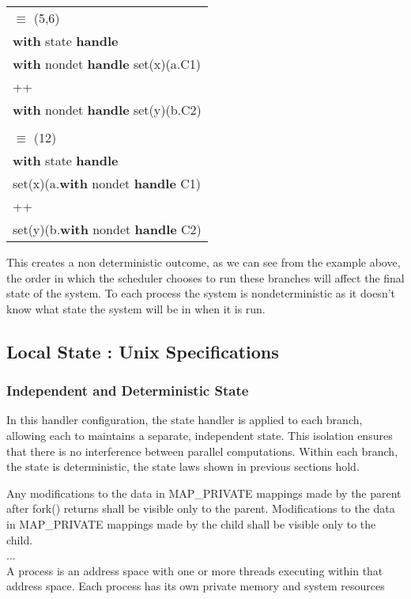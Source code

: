\documentclass[logo,bsc,singlespacing,parskip]{infthesis}
\begin{document}
\begin{longtable}{@{}l@{}}
\quad$\equiv$ (5,6) \\
\textbf{with } state \textbf{ handle} \\
\quad \textbf{with } nondet \textbf{ handle } set(x)(a.C1) \\
\quad ++ \\
\quad \textbf{with } nondet \textbf{ handle } set(y)(b.C2) \\
\\
\quad$\equiv$ (12) \\
\textbf{with } state \textbf{ handle} \\
\quad set(x)(a.\textbf{with } nondet \textbf{ handle } C1) \\
\quad ++ \\
\quad set(y)(b.\textbf{with } nondet \textbf{ handle } C2) \\
\end{longtable}


This creates a non deterministic outcome, as we can see from the example above, the order in which the scheduler chooses to run these branches will affect the final state of the system. To each process the system is nondeterministic as it doesn't know what state the system will be in when it is run. 

\subsection{Local State : Unix Specifications}

\subsubsection{Independent and Deterministic State} 
In this handler configuration, the state handler is applied to each branch, allowing each to maintains a separate, independent state. This isolation ensures that there is no interference between parallel computations. Within each branch, the state is deterministic, the state laws shown in previous sections hold.

\begin{tcolorbox}[colback=gray!10, colframe=gray!60, sharp corners, boxrule=0.5pt, title={POSIX Base Specifications, Issue 7, p.899}]
    Any modifications to the data in
 MAP\_PRIVATE mappings made by the parent after fork() returns shall be visible only to
 the parent. Modifications to the data in MAP\_PRIVATE mappings made by the child shall
 be visible only to the child.
  \\ ... \\
A process is an address space with one or more threads executing within that address space. Each process has its own private memory and system resources
\end{tcolorbox}
\end{document}
